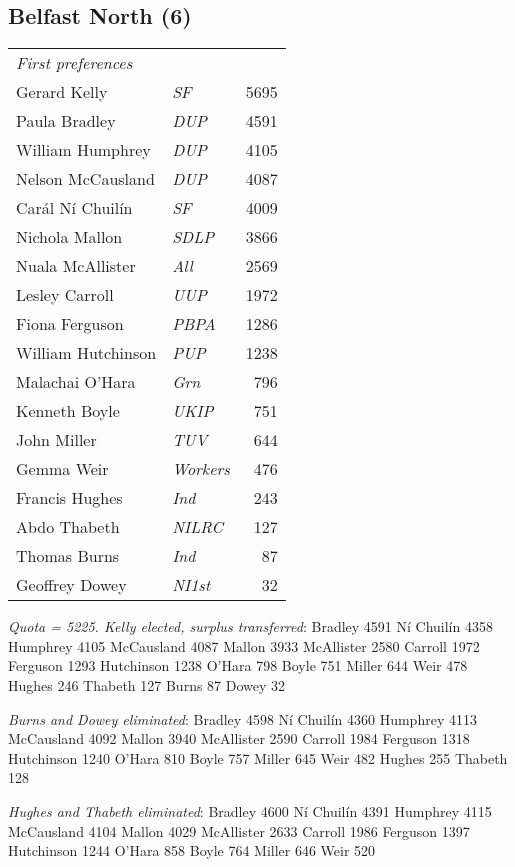 \begin{resultsiii}
\subsection*{Belfast North (6)}


\noindent
\begin{tabular*}{\columnwidth}{@{\extracolsep{\fill}} p{} >{\itshape}l r @{\extracolsep{\fill}}}
\emph{First preferences}\\
Gerard Kelly & SF & 5695\\
Paula Bradley & DUP & 4591\\
William Humphrey & DUP & 4105\\
Nelson McCausland & DUP & 4087\\
Carál Ní Chuilín & SF & 4009\\
Nichola Mallon & SDLP & 3866\\
Nuala McAllister & All & 2569\\
Lesley Carroll & UUP & 1972\\
Fiona Ferguson & PBPA & 1286\\
William Hutchinson & PUP & 1238\\
Malachai O'Hara & Grn & 796\\
Kenneth Boyle & UKIP & 751\\
John Miller & TUV & 644\\
Gemma Weir & Workers & 476\\
Francis Hughes & Ind & 243\\
Abdo Thabeth & NILRC & 127\\
Thomas Burns & Ind & 87\\
Geoffrey Dowey & NI1st & 32\\
\end{tabular*}

\emph{Quota = 5225.  Kelly elected, surplus transferred}: Bradley 4591 Ní Chuilín 4358 Humphrey 4105 McCausland 4087 Mallon 3933 McAllister 2580 Carroll 1972 Ferguson 1293 Hutchinson 1238 O'Hara 798 Boyle 751 Miller 644 Weir 478 Hughes 246 Thabeth 127 Burns 87 Dowey 32

\emph{Burns and Dowey eliminated}: Bradley 4598 Ní Chuilín 4360 Humphrey 4113 McCausland 4092 Mallon 3940 McAllister 2590 Carroll 1984 Ferguson 1318 Hutchinson 1240 O'Hara 810 Boyle 757 Miller 645 Weir 482 Hughes 255 Thabeth 128

\emph{Hughes and Thabeth eliminated}: Bradley 4600 Ní Chuilín 4391 Humphrey 4115 McCausland 4104 Mallon 4029 McAllister 2633 Carroll 1986 Ferguson 1397 Hutchinson 1244 O'Hara 858 Boyle 764 Miller 646 Weir 520


\end{resultsiii}
